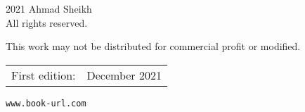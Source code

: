 \thispagestyle{empty}
\begingroup
\footnotesize
\parindent 0pt
\parskip \baselineskip
\textcopyright{} 2021 Ahmad Sheikh \\
All rights reserved.

    This work may not be distributed for commercial profit or modified.

\begin{center}
\begin{tabular}{ll}
First edition:  & December 2021
\end{tabular}
\end{center}

\vfill

\texttt{www.book-url.com}

\vspace*{2\baselineskip}


\endgroup
\clearpage
